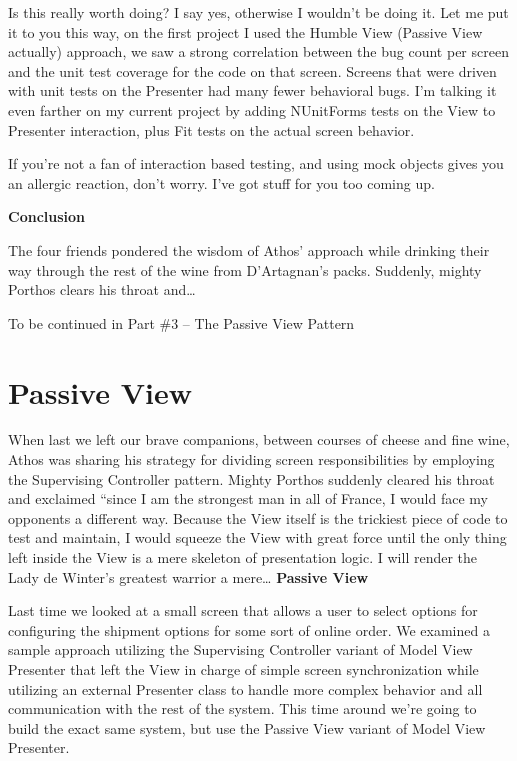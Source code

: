 \documentclass{article}
\begin{document}
{Is this really worth doing?  I say yes, otherwise I wouldn't be doing it.  Let me put it to you this way, on the first project I used the Humble View (Passive View actually) approach, we saw a strong correlation between the bug count per screen and the unit test coverage for the code on that screen.  Screens that were driven with unit tests on the Presenter had many fewer behavioral bugs.  I'm talking it even farther on my current project by adding NUnitForms tests on the View to Presenter interaction, plus Fit tests on the actual screen behavior. 

If you're not a fan of interaction based testing, and using mock objects gives you an allergic reaction, don't worry.  I've got stuff for you too coming up. 

  
\Large {\textbf{Conclusion}}

The four friends pondered the wisdom of Athos' approach while drinking their way through the rest of the wine from D'Artagnan's packs.  Suddenly, mighty Porthos clears his throat and…

 

To be continued in Part \#3 – The Passive View Pattern

\section{ Passive View } 

When last we left our brave companions, between courses of cheese and fine wine, Athos was sharing his strategy for dividing screen responsibilities by employing the Supervising Controller pattern.  Mighty Porthos suddenly cleared his throat and exclaimed “since I am the strongest man in all of France, I would face my opponents a different way.  Because the View itself is the trickiest piece of code to test and maintain, I would squeeze the View with great force until the only thing left inside the View is a mere skeleton of presentation logic.  I will render the Lady de Winter's greatest warrior a mere…
\Large {\textbf{Passive View}}

Last time we looked at a small screen that allows a user to select options for configuring the shipment options for some sort of online order.  We examined a sample approach utilizing the Supervising Controller variant of Model View Presenter that left the View in charge of simple screen synchronization while utilizing an external Presenter class to handle more complex behavior and all communication with the rest of the system.  This time around we're going to build the exact same system, but use the Passive View variant of Model View Presenter.

}
\end{document}

